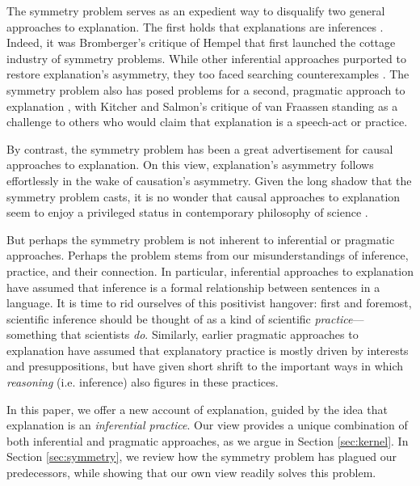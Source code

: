 \documentclass[natbib]{svjour3}                     %
\begin{document}
The symmetry problem serves as an expedient way to disqualify two general approaches to explanation. The first holds that explanations are inferences \citep{Friedman1974,Hempel1965,Kitcher1989,Schurz1999,Schurz1994}. Indeed, it was Bromberger's \citeyearpar{Bromberger1965} critique of Hempel that first launched the cottage industry of symmetry problems. While other inferential approaches \citep[e.g.][]{Kitcher1989} purported to restore explanation's asymmetry, they too faced searching counterexamples \citep[see][]{Barnes1992}.  The symmetry problem also has posed problems for a second, pragmatic approach to explanation \citep{Achinstein1983,Faye2007,Garfinkel1981,Risjord2000,Fraassen1980}, with Kitcher and Salmon's \citeyearpar{Kitcher1987} critique of van Fraassen standing as a challenge to others who would claim that explanation is a speech-act or practice. 

By contrast, the symmetry problem has been a great advertisement for causal approaches to explanation. On this view, explanation's asymmetry follows effortlessly in the wake of causation's asymmetry. Given the long shadow that the symmetry problem casts, it is no wonder that causal approaches to explanation seem to enjoy a privileged status in contemporary philosophy of science \citep{Strevens2008,Woodward2003}.

But perhaps the symmetry problem is not inherent to inferential or pragmatic approaches. Perhaps the problem stems from our misunderstandings of inference, practice, and their connection. In particular, inferential approaches to explanation have assumed that inference is a formal relationship between sentences in a language. It is time to rid ourselves of this positivist hangover: first and foremost, scientific inference should be thought of as a kind of scientific \textit{practice}---something that scientists \textit{do}. Similarly, earlier pragmatic approaches to explanation have assumed that explanatory practice is mostly driven by interests and presuppositions, but have given short shrift to the important ways in which \textit{reasoning} (i.e. inference) also figures in these practices.

In this paper, we offer a new account of explanation, guided by the idea that explanation is an \textit{inferential practice}. Our view provides a unique combination of both inferential and pragmatic approaches, as we argue in Section \ref{sec:kernel}. In Section \ref{sec:symmetry}, we review how the symmetry problem has plagued our predecessors, while showing that our own view readily solves this problem.
\end{document}
